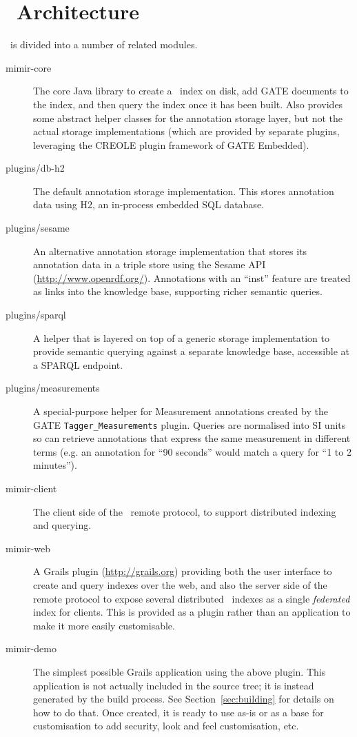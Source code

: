 \section{\Mimir\ Architecture}

\Mimir\ is divided into a number of related modules.

\begin{description}
\item[mimir-core] The core Java library to create a \Mimir\ index on disk, add
GATE documents to the index, and then query the index once it has been built.
Also provides some abstract helper classes for the annotation storage layer,
but not the actual storage implementations (which are provided by separate
plugins, leveraging the CREOLE plugin framework of GATE Embedded).

\item[plugins/db-h2] The default annotation storage implementation.  This
stores annotation data using H2, an in-process embedded SQL database.

\item[plugins/sesame] An alternative annotation storage implementation that
stores its annotation data in a triple store using the Sesame API
(\url{http://www.openrdf.org/}).  Annotations with an ``inst'' feature are
treated as links into the knowledge base, supporting richer semantic queries.

\item[plugins/sparql] A helper that is layered on top of a generic storage
implementation to provide semantic querying against a separate knowledge base,
accessible at a SPARQL endpoint.

\item[plugins/measurements] A special-purpose helper for Measurement
annotations created by the GATE {\tt Tagger\_Measurements} plugin.  Queries are
normalised into SI units so can retrieve annotations that express the same
measurement in different terms (e.g. an annotation for ``90 seconds'' would
match a query for ``1 to 2 minutes'').

\item[mimir-client] The client side of the \Mimir\ remote protocol, to support
distributed indexing and querying.

\item[mimir-web] A Grails plugin (\url{http://grails.org}) providing
both the user interface to create and query indexes over the web, and also the
server side of the remote protocol to expose several distributed \Mimir\
indexes as a single {\em federated} index for clients.  This is provided as a
plugin rather than an application to make it more easily customisable.

\item[mimir-demo] The simplest possible Grails application using the above
plugin. This application is not actually included in the source tree; it is
instead generated by the build process. See Section~\ref{sec:building} for
details on how to do that. Once created, it is ready to use as-is or as a base
for customisation to add security, look and feel customisation, etc.
\end{description}

